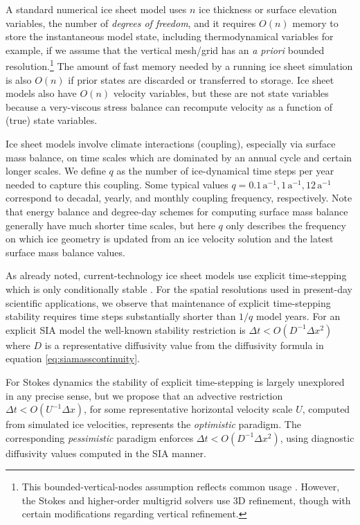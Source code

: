 \documentclass[twocolumn,letterpaper]{igs}
\begin{document}
A standard numerical ice sheet model uses $n$ ice thickness or surface elevation variables, the number of \emph{degrees of freedom}, and it requires $O(n)$ memory to store the instantaneous model state, including thermodynamical variables for example, if we assume that the vertical mesh/grid has an \emph{a priori} bounded resolution.\footnote{This bounded-vertical-nodes assumption reflects common usage \citep[for example]{Aschwandenetal2019,Brinkerhoffetal2017,Hoffmanetal2018}.  However, the \cite{IsaacStadlerGhattas2015} Stokes and \cite{BrownSmithAhmadia2013} higher-order multigrid solvers use 3D refinement, though with certain modifications regarding vertical refinement.}  The amount of fast memory needed by a running ice sheet simulation is also $O(n)$ if prior states are discarded or transferred to storage.  Ice sheet models also have $O(n)$ velocity variables, but these are not state variables because a very-viscous stress balance can recompute velocity as a function of (true) state variables.
 
Ice sheet models involve climate interactions (coupling), especially via surface mass balance, on time scales which are dominated by an annual cycle and certain longer scales.  We define $q$ as the number of ice-dynamical time steps per year needed to capture this coupling.  Some typical values $q=0.1 \,\text{a}^{-1}, 1 \,\text{a}^{-1}, 12 \,\text{a}^{-1}$ correspond to decadal, yearly, and monthly coupling frequency, respectively.  Note that energy balance and degree-day schemes for computing surface mass balance generally have much shorter time scales, but here $q$ only describes the frequency on which ice geometry is updated from an ice velocity solution and the latest surface mass balance values.

As already noted, current-technology ice sheet models use explicit time-stepping which is only conditionally stable \citep{LeVeque2007}.  For the spatial resolutions used in present-day scientific applications, we observe that maintenance of explicit time-stepping stability requires time steps substantially shorter than $1/q$ model years.  For an explicit SIA model the well-known stability restriction is $\Delta t < O(D^{-1} \Delta x^2)$ \citep{Bueleretal2005,HindmarshPayne1996} where $D$ is a representative diffusivity value from the diffusivity formula in equation \eqref{eq:siamasscontinuity}.

For Stokes dynamics the stability of explicit time-stepping is largely unexplored in any precise sense, but we propose that an advective restriction $\Delta t < O(U^{-1} \Delta x)$, for some representative horizontal velocity scale $U$, computed from simulated ice velocities, represents the \emph{optimistic} paradigm.  The corresponding \emph{pessimistic} paradigm enforces $\Delta t < O(D^{-1} \Delta x^2)$, using diagnostic diffusivity values computed in the SIA manner.
\end{document}
